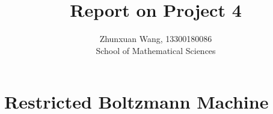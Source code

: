 \documentclass[10pt]{article}
\begin{document}
 
 
\title{\textbf{Report on Project 4}}%
\author{Zhunxuan Wang, 13300180086\\ %
School of Mathematical Sciences} %

\maketitle
\section{Restricted Boltzmann Machine}
\end{document}
